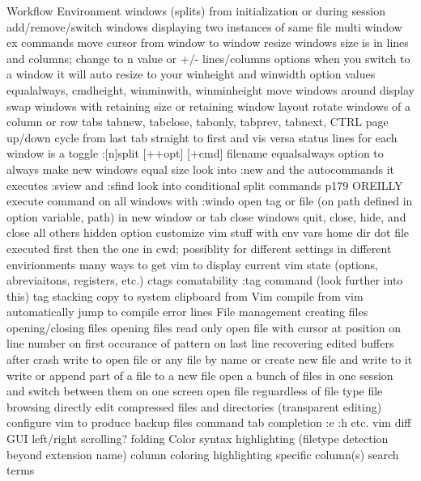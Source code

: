 \documentclass[12pt]{book}
\begin{document}
{Workflow
  Environment
    windows (splits)
      from initialization or during session
      add/remove/switch windows
      displaying two instances of same file
      multi window ex commands
      move cursor from window to window
      resize windows
        size is in lines and columns; change to n value or +/- lines/columns
        options 
          when you switch to a window it will auto resize to your winheight and winwidth option values
          equalalways, cmdheight, winminwith, winminheight
      move windows around display
        swap windows with retaining size or retaining window layout
        rotate windows of a column or row
      tabs
        tabnew, tabclose, tabonly, tabprev, tabnext, CTRL page up/down
        cycle from last tab straight to first and vis versa
      status lines for each window is a toggle
      :[n]split [++opt] [+cmd] filename
      equalsalways option to always make new windows equal size
      look into :new and the autocommands it executes
      :sview and :sfind
      look into conditional split commands p179 OREILLY
      execute command on all windows with :windo 
      open tag or file (on path defined in option variable, path) in new window or tab
      close windows
        quit, close, hide, and close all others
          hidden option
    customize vim stuff with env vars 
  home dir dot file executed first then the one in cwd; possiblity for different settings in different envirionments
  many ways to get vim to display current vim state (options, abreviaitons, registers, etc.)
  ctags comatability
    :tag command (look further into this)
    tag stacking
  copy to system clipboard from Vim
  compile from vim
  automatically jump to compile error lines
  File management
    creating files
    opening/closing files
    opening files read only
    open file with cursor at position
      on line number
      on first occurance of pattern
      on last line
    recovering edited buffers after crash
    write to open file or any file by name or create new file and write to it
    write or append part of a file to a new file
    open a bunch of files in one session and switch between them on one screen
    open file reguardless of file type
    file browsing
    directly edit compressed files and directories (transparent editing)
    configure vim to produce backup files
  command tab completion :e :h etc.
  vim diff
GUI
  left/right scrolling?
  folding
  Color
    syntax highlighting (filetype detection beyond extension name)
    column coloring
  highlighting
    specific column(s)
    search terms
}
\end{document}
